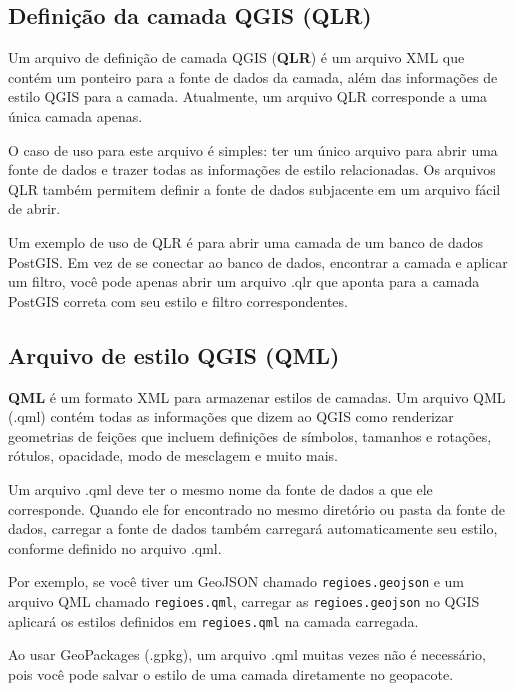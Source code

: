 \documentclass[
]{krantz}
\begin{document}
\hypertarget{definiuxe7uxe3o-da-camada-qgis-qlr}{%
\subsection{Definição da camada QGIS (QLR)}\label{definiuxe7uxe3o-da-camada-qgis-qlr}}

Um arquivo de definição de camada QGIS (\textbf{QLR}) é um arquivo XML que contém um ponteiro para a fonte de dados da camada, além das informações de estilo QGIS para a camada. Atualmente, um arquivo QLR corresponde a uma única camada apenas.

O caso de uso para este arquivo é simples: ter um único arquivo para abrir uma fonte de dados e trazer todas as informações de estilo relacionadas. Os arquivos QLR também permitem definir a fonte de dados subjacente em um arquivo fácil de abrir.

Um exemplo de uso de QLR é para abrir uma camada de um banco de dados PostGIS. Em vez de se conectar ao banco de dados, encontrar a camada e aplicar um filtro, você pode apenas abrir um arquivo .qlr que aponta para a camada PostGIS correta com seu estilo e filtro correspondentes.

\hypertarget{arquivo-de-estilo-qgis-qml}{%
\subsection{Arquivo de estilo QGIS (QML)}\label{arquivo-de-estilo-qgis-qml}}

\textbf{QML} é um formato XML para armazenar estilos de camadas. Um arquivo QML (.qml) contém todas as informações que dizem ao QGIS como renderizar geometrias de feições que incluem definições de símbolos, tamanhos e rotações, rótulos, opacidade, modo de mesclagem e muito mais.

Um arquivo .qml deve ter o mesmo nome da fonte de dados a que ele corresponde. Quando ele for encontrado no mesmo diretório ou pasta da fonte de dados, carregar a fonte de dados também carregará automaticamente seu estilo, conforme definido no arquivo .qml.

Por exemplo, se você tiver um GeoJSON chamado \texttt{regioes.geojson} e um arquivo QML chamado \texttt{regioes.qml}, carregar as \texttt{regioes.geojson} no QGIS aplicará os estilos definidos em \texttt{regioes.qml} na camada carregada.

Ao usar GeoPackages (.gpkg), um arquivo .qml muitas vezes não é necessário, pois você pode salvar o estilo de uma camada diretamente no geopacote.
\end{document}
